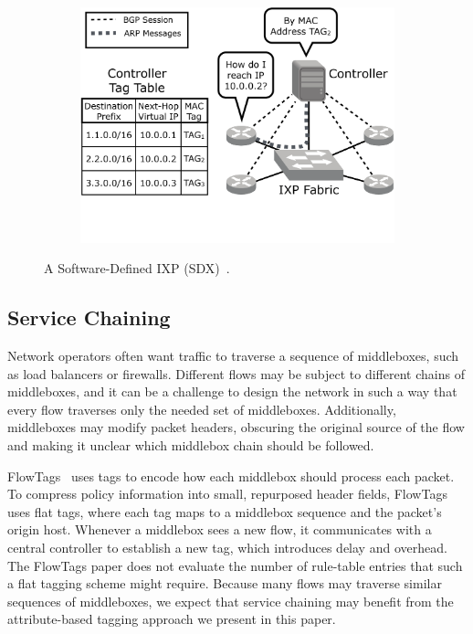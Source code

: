 \begin{figure}
\begin{minipage}{1\linewidth}
\begin{subfigure}[b]{0.96\linewidth}
\includegraphics[width=\linewidth,trim={0 5cm 0 0}]{figures/sdx_example}
\end{subfigure} 
\end{minipage} 
\caption{A Software-Defined IXP (SDX)~\cite{isdx}. }
\label{fig:sdx_example}
\end{figure}

\subsection{Service Chaining}
Network operators often want traffic to traverse a
sequence of middleboxes, such as load balancers or firewalls.  Different
flows may be subject to different chains of middleboxes, and it can be a
challenge to design the network in such a way that every flow traverses
only the needed set of middleboxes. Additionally, middleboxes may modify
packet headers, obscuring the original source of the flow and making it
unclear which middlebox chain should be followed.

FlowTags~\cite{flowtags} uses tags to encode how each middlebox should
process each packet. To compress policy information into small,
repurposed header fields, FlowTags uses flat tags, where each tag maps
to a middlebox sequence and the packet's origin host. Whenever a
middlebox sees a new flow, it communicates with a central controller
to establish a new tag, which introduces delay and overhead.  The
FlowTags paper does not evaluate the number of rule-table entries that
such a flat tagging scheme might require. Because many flows may
traverse similar sequences of middleboxes, we expect that service
chaining may benefit from the attribute-based tagging approach we
present in this paper. 

